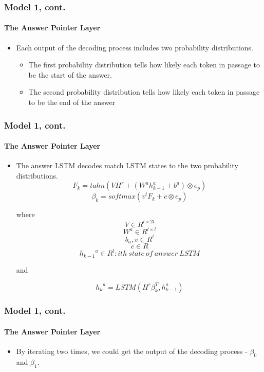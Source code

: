\documentclass{beamer}
\begin{document}
\begin{frame} \frametitle{Model 1, cont.}\framesubtitle{The Answer Pointer Layer}
    \begin{itemize}
        \item Each output of the decoding process includes two probability distributions.
           \begin{itemize}
               \item The first probability distribution tells how likely each token in passage to be the start of the answer.
               \item The second probability distribution tells how likely each token in passage to be the end of the answer
           \end{itemize}
    \end{itemize}

\end{frame}

\begin{frame}\frametitle{Model 1, cont.}\framesubtitle{The Answer Pointer Layer}
    \begin{itemize}
        \item The answer LSTM decodes match LSTM states to the two probability distributions.
        $$F_k = tahn(VH^r + (W^a{h^a_{k-1}} +  b^a) \otimes e_p)$$
        $$\beta _k = softmax(v^tF_k + c \otimes e_p)$$


        where
        $$V \in R^{l \times 2l}$$
        $$W^a\in R^{l \times l} $$
        $$b_a, v\in R^{l}  $$
        $$c \in R $$
        $${h_{k-1}}^a\in R^{l}: ith\ state\ of\ answer\ LSTM  $$

        and


        $${h_k}^a = LSTM(H^r\beta _k^T, h_{k-1}^a)$$
    \end{itemize}
\end{frame}

\begin{frame}\frametitle{Model 1, cont.}\framesubtitle{The Answer Pointer Layer}
    \begin{itemize}
        \item By iterating two times, we could get the output of the decoding process - $\beta _0$ and $\beta _1$.
    \end{itemize}

\end{frame}
\end{document}
